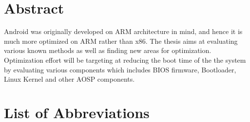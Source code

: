 \documentclass{mainreport}
\begin{document}
\chapter*{Abstract}\label{Abstract}

{
\label{Abstract}



\hspace{6mm} Android was originally developed on ARM architecture in mind, and hence it is much more optimized on ARM rather than x86. The thesis aims at evaluating various known methods as well as finding new areas for optimization. Optimization effort will be targeting at reducing the boot time of the the system by evaluating various components which includes BIOS firmware, Bootloader, Linux Kernel and other AOSP components.
}

\tableofcontents


%

%

\listoffigures
{}
{}


\chapter*{List of Abbreviations}\label{abbrv}













\nocite{*}


\end{document}
